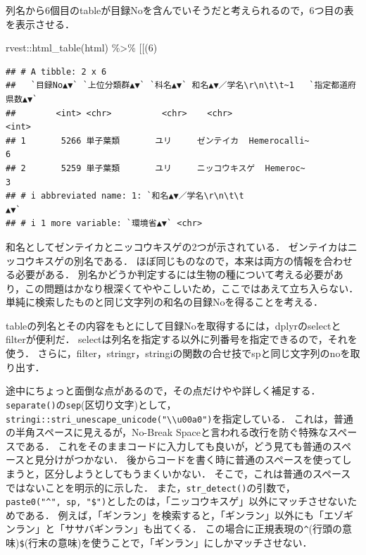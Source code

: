 \documentclass[
]{article}
\newenvironment{Shaded}{\begin{snugshade}}{\end{snugshade}}
\newcommand{\AttributeTok}[1]{\textcolor[rgb]{0.77,0.63,0.00}{#1}}
\newcommand{\DecValTok}[1]{\textcolor[rgb]{0.00,0.00,0.81}{#1}}
\newcommand{\FunctionTok}[1]{\textcolor[rgb]{0.00,0.00,0.00}{#1}}
\newcommand{\NormalTok}[1]{#1}
\newcommand{\SpecialCharTok}[1]{\textcolor[rgb]{0.00,0.00,0.00}{#1}}
\newcommand{\StringTok}[1]{\textcolor[rgb]{0.31,0.60,0.02}{#1}}
\begin{document}
列名から6個目のtableが目録Noを含んでいそうだと考えられるので，6つ目の表を表示させる．

\begin{Shaded}
\begin{Highlighting}[]
\NormalTok{rvest}\SpecialCharTok{::}\FunctionTok{html\_table}\NormalTok{(html) }\SpecialCharTok{\%\textgreater{}\%}
  \StringTok{\textasciigrave{}}\AttributeTok{[[}\StringTok{\textasciigrave{}}\NormalTok{(}\DecValTok{6}\NormalTok{)}
\end{Highlighting}
\end{Shaded}

\begin{verbatim}
## # A tibble: 2 x 6
##   `目録No▲▼` `上位分類群▲▼` `科名▲▼` 和名▲▼／学名\r\n\t\t~1   `指定都道府県数▲▼`
##        <int> <chr>          <chr>    <chr>                                 <int>
## 1       5266 単子葉類       ユリ     ゼンテイカ  Hemerocalli~                  6
## 2       5259 単子葉類       ユリ     ニッコウキスゲ  Hemeroc~                  3
## # i abbreviated name: 1: `和名▲▼／学名\r\n\t\t                             ▲▼`
## # i 1 more variable: `環境省▲▼` <chr>
\end{verbatim}

和名としてゼンテイカとニッコウキスゲの2つが示されている．
ゼンテイカはニッコウキスゲの別名である．
ほぼ同じものなので，本来は両方の情報を合わせる必要がある．
別名かどうか判定するには生物の種について考える必要があり，この問題はかなり根深くてややこしいため，ここではあえて立ち入らない．
単純に検索したものと同じ文字列の和名の目録Noを得ることを考える．

tableの列名とその内容をもとにして目録Noを取得するには，dplyrのselectとfilterが便利だ．
selectは列名を指定する以外に列番号を指定できるので，それを使う．
さらに，filter，stringr，stringiの関数の合せ技でspと同じ文字列のnoを取り出す．

途中にちょっと面倒な点があるので，その点だけやや詳しく補足する．
\texttt{separate()}の\texttt{sep}(区切り文字)として，\texttt{stringi::stri\_unescape\_unicode("\textbackslash{}\textbackslash{}u00a0")}を指定している．
これは，普通の半角スペースに見えるが，No-Break Spaceと言われる改行を防ぐ特殊なスペースである．
これをそのままコードに入力しても良いが，どう見ても普通のスペースと見分けがつかない．
後からコードを書く時に普通のスペースを使ってしまうと，区分しようとしてもうまくいかない．
そこで，これは普通のスペースではないことを明示的に示した．
また，\texttt{str\_detect()}の引数で，\texttt{paste0("\^{}",\ sp,\ "\$")}としたのは，「ニッコウキスゲ」以外にマッチさせないためである．
例えば，「ギンラン」を検索すると，「ギンラン」以外にも「エゾギンラン」と「ササバギンラン」も出てくる．
この場合に正規表現の\texttt{\^{}}(行頭の意味)\texttt{\$}(行末の意味)を使うことで，「ギンラン」にしかマッチさせない．
\end{document}

